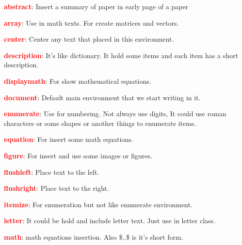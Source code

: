\documentclass[12pt, a4paper, onecolumn]{article}
\begin{document}
	\begin{description}
		
		\item \textbf{\textcolor{red}{abstract}}: Insert a summary of paper in early page of a paper
		
		\item \textbf{\textcolor{red}{array}}: Use in math texts. For create matrices and vectors.
		
		\item \textbf{\textcolor{red}{center}}: Center any text that placed in this environment.
		
		\item \textbf{\textcolor{red}{description}}: It's like dictionary. It hold some items and each item has a short description.
		
		\item \textbf{\textcolor{red}{displaymath}}: For show mathematical equations.
		
		\item \textbf{\textcolor{red}{document}}: Default main environment that we start writing in it.
		
		\item \textbf{\textcolor{red}{enumerate}}: Use for numbering. Not always use digits, It could use roman characters or some shapes or another things to enumerate items.
		
		\item \textbf{\textcolor{red}{equation}}: For insert some math equations.
		
		\item \textbf{\textcolor{red}{figure}}: For insert and use some images or figures.
		
		\item \textbf{\textcolor{red}{flushleft}}: Place text to the left.
		
		\item \textbf{\textcolor{red}{flushright}}: Place text to the right.
		
		\item \textbf{\textcolor{red}{itemize}}: For enumeration but not like enumerate environment.
		
		\item \textbf{\textcolor{red}{letter}}: It could be hold and include letter text. Just use in letter class.
		
		\item \textbf{\textcolor{red}{math}}: math equations insertion. Also \$..\$ is it's short form.
		

\end{description}
\end{document}
